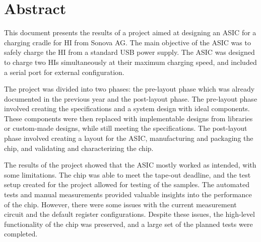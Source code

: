 \section*{\huge Abstract}
This document presents the results of a project aimed at designing an \ac{ASIC} for a charging cradle for \ac{HI} from Sonova AG. The main objective of the \ac{ASIC} was to safely charge the HI from a standard USB power supply. The \ac{ASIC} was designed to charge two HIs simultaneously at their maximum charging speed, and included a serial port for external configuration.

The project was divided into two phases: the pre-layout phase which was already documented in the previous year and the post-layout phase. The pre-layout phase involved creating the specifications and a system design with ideal components. These components were then replaced with implementable designs from libraries or custom-made designs, while still meeting the specifications. 
The post-layout phase involved creating a layout for the ASIC, manufacturing and packaging the chip, and validating and characterizing the chip.

The results of the project showed that the \ac{ASIC} mostly worked as intended, with some limitations. The chip was able to meet the tape-out deadline, and the test setup created for the project allowed for testing of the samples. The automated tests and manual measurements provided valuable insights into the performance of the chip. However, there were some issues with the current measurement circuit and the default register configurations. Despite these issues, the high-level functionality of the chip was preserved, and a large set of the planned tests were completed.



\label{chap:abstract}
\clearpage
